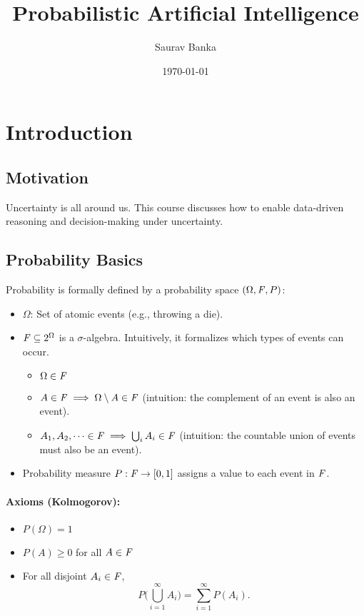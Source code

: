 \documentclass[11pt]{article}
\title{Probabilistic Artificial Intelligence}
\author{Saurav Banka}
\date{\today}
\begin{document}
\maketitle

\section{Introduction}

\subsection{Motivation}
Uncertainty is all around us. This course discusses how to enable data-driven reasoning and decision-making under uncertainty. 

\subsection{Probability Basics}
Probability is formally defined by a probability space $(\Omega, \mathit{F}, P)$:
\begin{itemize}
    \item $\Omega$: Set of atomic events (e.g., throwing a die).
    \item $\mathit{F} \subseteq 2^{\Omega}$ is a $\sigma$-algebra. Intuitively, it formalizes which types of events can occur.
    \begin{itemize}
        \item $\Omega \in \mathit{F}$
        \item $A \in \mathit{F} \implies \Omega \setminus A \in \mathit{F}$ (intuition: the complement of an event is also an event).
        \item $A_1, A_2, \dots \in \mathit{F} \implies \bigcup_{i} A_i \in \mathit{F}$ (intuition: the countable union of events must also be an event).
    \end{itemize}
    \item Probability measure $P: \mathit{F} \to [0,1]$ assigns a value to each event in $\mathit{F}$.
\end{itemize}

\paragraph{Axioms (Kolmogorov):}
\begin{itemize}
    \item $P(\Omega) = 1$
    \item $P(A) \geq 0$ for all $A \in \mathit{F}$
    \item For all disjoint $A_i \in \mathit{F}$, 
    \[
        P\Big(\bigcup_{i=1}^{\infty} A_i\Big) = \sum_{i=1}^\infty P(A_i).
    \]
\end{itemize}
\end{document}
